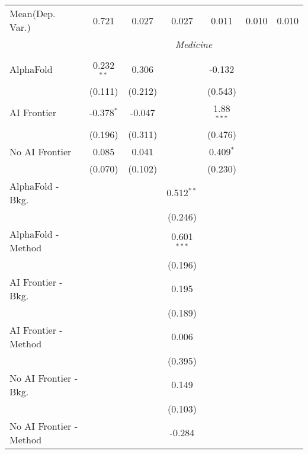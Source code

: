 \begin{tabular}{lcccccc}
Mean(Dep. Var.) & 0.721 & 0.027 & 0.027 & 0.011 & 0.010 & 0.010 \\
 & \multicolumn{6}{c}{\textit{Medicine}} \\ \\
   AlphaFold               & 0.232$^{**}$ & 0.306   &               & -0.132       &       &   \\   
                           & (0.111)      & (0.212) &               & (0.543)      &       &   \\   
   AI Frontier             & -0.378$^{*}$ & -0.047  &               & 1.88$^{***}$ &       &   \\   
                           & (0.196)      & (0.311) &               & (0.476)      &       &   \\   
   No AI Frontier          & 0.085        & 0.041   &               & 0.409$^{*}$  &       &   \\   
                           & (0.070)      & (0.102) &               & (0.230)      &       &   \\   
   AlphaFold - Bkg.        &              &         & 0.512$^{**}$  &              &       &   \\   
                           &              &         & (0.246)       &              &       &   \\   
   AlphaFold - Method      &              &         & 0.601$^{***}$ &              &       &   \\   
                           &              &         & (0.196)       &              &       &   \\   
   AI Frontier - Bkg.      &              &         & 0.195         &              &       &   \\   
                           &              &         & (0.189)       &              &       &   \\   
   AI Frontier - Method    &              &         & 0.006         &              &       &   \\   
                           &              &         & (0.395)       &              &       &   \\   
   No AI Frontier - Bkg.   &              &         & 0.149         &              &       &   \\   
                           &              &         & (0.103)       &              &       &   \\   
   No AI Frontier - Method &              &         & -0.284        &              &       &   \\   

\end{tabular}
